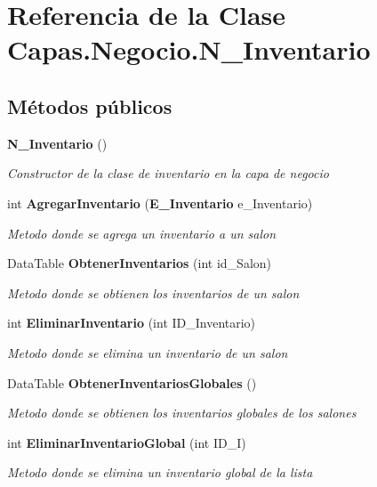 \section{Referencia de la Clase Capas.\+Negocio.\+N\+\_\+\+Inventario}
\label{class_capas_1_1_negocio_1_1_n___inventario}
\subsection*{Métodos públicos}
\begin{DoxyCompactItemize}
\item 
{\bf N\+\_\+\+Inventario} ()
\begin{DoxyCompactList}\small\item\em Constructor de la clase de inventario en la capa de negocio \end{DoxyCompactList}\item 
int {\bf Agregar\+Inventario} ({\bf E\+\_\+\+Inventario} e\+\_\+\+Inventario)
\begin{DoxyCompactList}\small\item\em Metodo donde se agrega un inventario a un salon \end{DoxyCompactList}\item 
Data\+Table {\bf Obtener\+Inventarios} (int id\+\_\+\+Salon)
\begin{DoxyCompactList}\small\item\em Metodo donde se obtienen los inventarios de un salon \end{DoxyCompactList}\item 
int {\bf Eliminar\+Inventario} (int I\+D\+\_\+\+Inventario)
\begin{DoxyCompactList}\small\item\em Metodo donde se elimina un inventario de un salon \end{DoxyCompactList}\item 
Data\+Table {\bf Obtener\+Inventarios\+Globales} ()
\begin{DoxyCompactList}\small\item\em Metodo donde se obtienen los inventarios globales de los salones \end{DoxyCompactList}\item 
int {\bf Eliminar\+Inventario\+Global} (int I\+D\+\_\+I)
\begin{DoxyCompactList}\small\item\em Metodo donde se elimina un inventario global de la lista \end{DoxyCompactList}\item 

\end{DoxyCompactItemize}
